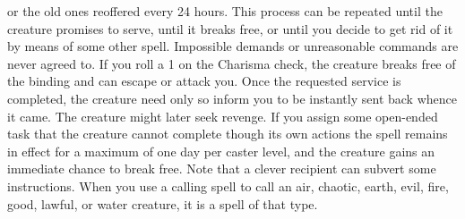 or the old ones reoffered every 24 hours. This process can be repeated until the
creature promises to serve, until it breaks free, or until you decide to get rid
of it by means of some other spell. Impossible demands or unreasonable commands
are never agreed to. If you roll a 1 on the Charisma check, the creature breaks
free of the binding and can escape or attack you.
Once the requested service is completed, the creature need only so inform you to
be instantly sent back whence it came. The creature might later seek revenge. If
you assign some open-ended task that the creature cannot complete though its own
actions the spell remains in effect for a maximum of one day per caster level,
and the creature gains an immediate chance to break free. Note that a clever recipient
can subvert some instructions.
When you use a calling spell to call an air, chaotic, earth, evil, fire, good,
lawful, or water creature, it is a spell of that type.